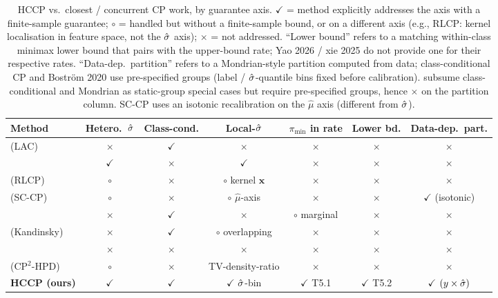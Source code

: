 \begin{table}[h]
\centering
\footnotesize
\caption{HCCP vs.\ closest / concurrent CP work, by guarantee axis. $\checkmark$ = method explicitly addresses the axis with a finite-sample guarantee; $\circ$ = handled but without a finite-sample bound, or on a different axis (e.g., RLCP: kernel localisation in feature space, not the $\hat{\sigma}$ axis); $\times$ = not addressed. ``Lower bound'' refers to a matching within-class minimax lower bound that pairs with the upper-bound rate; Yao 2026 / xie 2025 do not provide one for their respective rates. ``Data-dep.\ partition'' refers to a Mondrian-style partition computed from data; class-conditional CP \citep{sadinle2019lac} and Boström 2020 use pre-specified groups (label / $\hat{\sigma}$-quantile bins fixed before calibration). \citet{bairaktari2025kandinsky} subsume class-conditional and Mondrian as static-group special cases but require pre-specified groups, hence $\times$ on the partition column. SC-CP \citep{vanderlaan2024sccp} uses an isotonic recalibration on the $\hat\mu$ axis (different from $\hat{\sigma}$).}
\label{tab:subsumption}
\setlength{\tabcolsep}{2pt}
\begin{tabular}{lcccccc}
\toprule
Method & Hetero.\ $\hat{\sigma}$ & Class-cond. & Local-$\hat{\sigma}$ & $\pi_{\min}$ in rate & Lower bd. & Data-dep.\ part. \\
\midrule
\citet{sadinle2019lac} (LAC)              & $\times$ & $\checkmark$ & $\times$ & $\times$ & $\times$ & $\times$ \\
\citet{bostrom2020mondrian}               & $\checkmark$ & $\times$ & $\checkmark$ & $\times$ & $\times$ & $\times$ \\
\citet{hore2025rlcp} (RLCP)               & $\circ$ & $\times$ & $\circ$ kernel $\mathbf{x}$ & $\times$ & $\times$ & $\times$ \\
\citet{vanderlaan2024sccp} (SC-CP)        & $\circ$ & $\times$ & $\circ$ $\hat\mu$-axis & $\times$ & $\times$ & $\checkmark$ (isotonic) \\
\citet{xie2025imbalancedcp}               & $\times$ & $\checkmark$ & $\times$ & $\circ$ marginal & $\times$ & $\times$ \\
\citet{bairaktari2025kandinsky} (Kandinsky) & $\times$ & $\checkmark$ & $\circ$ overlapping & $\times$ & $\times$ & $\times$ \\
\citet{yao2026nonasymp}                   & $\times$ & $\times$ & $\times$ & $\times$ & $\times$ & $\times$ \\
\citet{plassier2025cp2hpd} (CP$^2$-HPD)   & $\circ$ & $\times$ & TV-density-ratio & $\times$ & $\times$ & $\times$ \\
\midrule
\textbf{HCCP (ours)} & $\checkmark$ & $\checkmark$ & $\checkmark$ $\hat{\sigma}$-bin & $\checkmark$ T5.1 & $\checkmark$ T5.2 & $\checkmark$ $(y \times \hat{\sigma})$ \\
\bottomrule
\end{tabular}
\end{table}

